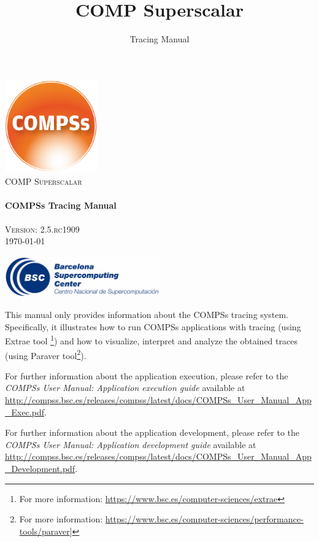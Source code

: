 \documentclass[a4paper,12pt]{article}
\title{COMP Superscalar}
\author{Tracing Manual}
\def \compssversion {2.5.rc1909}
\begin{document}
  \hypersetup{pageanchor=false}
  \begin{titlepage} 
    \begin{center} 
      \includegraphics[width=0.3\textwidth]{./Figures/Logos/degradado-naranja-compss.jpg}~\\[1cm] 
      \textsc{\LARGE COMP Superscalar}\\[1.5cm] 
      
      \HRule \\[0.4cm] 
      { \huge \bfseries COMPSs Tracing Manual \\[0.4cm] }
      \HRule \\[1.5cm] 

      { \large \textsc{Version: \compssversion}} \\[0.3cm]
      { \large \today } 
      
      \vfill 
      \includegraphics[width=0.5\textwidth]{./Figures/bsc_280.jpg}~\\[1cm]
    \end{center} 
  \end{titlepage}
  \hypersetup{pageanchor=true}
  
  {
  
    This manual only provides information about the COMPSs tracing system. Specifically, it illustrates how to run COMPSs applications
    with tracing (using Extrae tool \footnote{For more information: \url{https://www.bsc.es/computer-sciences/extrae}}) and how to visualize, 
    interpret and analyze the obtained traces (using Paraver tool\footnote{For more information: \url{https://www.bsc.es/computer-sciences/performance-tools/paraver}]}).
    \newline

    For further information about the application execution, please refer to the \textit{COMPSs User Manual: Application execution
    guide} available at \url{http://compss.bsc.es/releases/compss/latest/docs/COMPSs_User_Manual_App_Exec.pdf}.
    \newline
    
    For further information about the application development, please refer to the \textit{COMPSs User Manual: Application development
    guide} available at \url{http://compss.bsc.es/releases/compss/latest/docs/COMPSs_User_Manual_App_Development.pdf}.

  }
  
\end{document}
